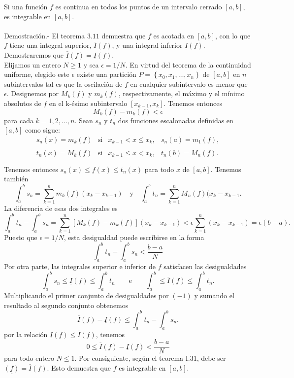\begin{teo}
    Si una función $f$ es continua en todos los puntos de un intervalo cerrado $[a,b]$, es integrable en $[a,b]$.\\\\
	Demostración.-\; El teorema $3.11$ demuestra que $f$ es acotada en $[a,b]$, con lo que $f$ tiene una integral superior, $\overline{I}(f)$, y una integral inferior $\underline{I}(f)$. Demostraremos que $\overline{I}(f)=\underline{I}(f)$.\\
	Elijamos un entero $N\geq 1$ y sea $\epsilon=1/N$. En virtud del teorema de la continuidad uniforme, elegido este $\epsilon$ existe una partición $P=\left\{x_0,x_1,\ldots,x_n\right\}$ de $[a,b]$ en $n$ subintervalos tal es que la oscilación de $f$ en cualquier subintervalo es menor que $\epsilon$. Designemos por $M_k(f)$ y $m_k(f)$, respectivamente, el máximo y el mínimo absolutos de $f$ en el k-ésimo subintervalo $[x_{k-1},x_k]$. Tenemos entonces
	$$M_k(f)-m_k(f)<\epsilon$$
	para cada $k=1,2,\ldots,n$. Sean $s_n$ y $t_n$ dos funciones escalonadas definidas en $[a,b]$ como sigue:
	$$\begin{array}{cccc}
	    s_n(x)=m_k(f) & \mbox{si} & x_{k-1}<x\leq x_k, & s_n(a)=m_1(f), \\\\
	    t_n(x)=M_k(f) & \mbox{si} & x_{k-1}\leq x < x_k, & t_n(b)=M_n(f). \\\\
	\end{array}$$
	Tenemos entonces $s_n(x)\leq f(x)\leq t_n(x)$ para todo $x$ de $[a,b]$. Tenemos también 
	$$\int_a^b s_n = \sum_{k=1}^n m_k(f)(x_k-x_{k-1})\quad \mbox{y}\quad \int_a^b t_n = \sum_{k=1}^n M_n(f)(x_k - x_{k-1}.$$
	La diferencia de esas dos integrales es
	$$\int_a^b t_n - \int_a^b s_n = \sum_{k=1}^n \left[M_k(f)-m_k(f)\right](x_k-x_{k-1})<\epsilon \sum_{k=1}^n (x_k-x_{k-1})=\epsilon(b-a).$$
	Puesto que $\epsilon = 1/N$, esta desigualdad puede escribirse en la forma 
	$$\int_a^b t_n - \int_a^b s_n < \dfrac{b-a}{N}$$
	Por otra parte, las integrales superior e inferior de $f$ satisfacen las desigualdades
	$$\int_a^b s_n\leq \underline{I}(f) \leq \int_a^b t_n \qquad \mbox{e}\qquad \int_a^b \leq \overline{I}(f)\leq \int_a^b t_n.$$
	Multiplicando el primer conjunto de desigualdades por $(-1)$ y sumando el resultado al segundo conjunto obtenemos
	$$\overline{I}(f)-\underline{I}(f)\leq \int_a^b t_n - \int_a^b s_n.$$
	por la relación $\underline{I}(f)\leq \overline{I}(f)$, tenemos
	$$0\leq \overline{I}(f)-\underline{I}(f)<\dfrac{b-a}{N}$$
	para todo entero $N\leq 1$. Por consiguiente, según el teorema I.31, debe ser $\underline{(f)}=\overline{I}(f)$. Esto demuestra que $f$ es integrable en $[a,b]$.\\

\end{teo}


